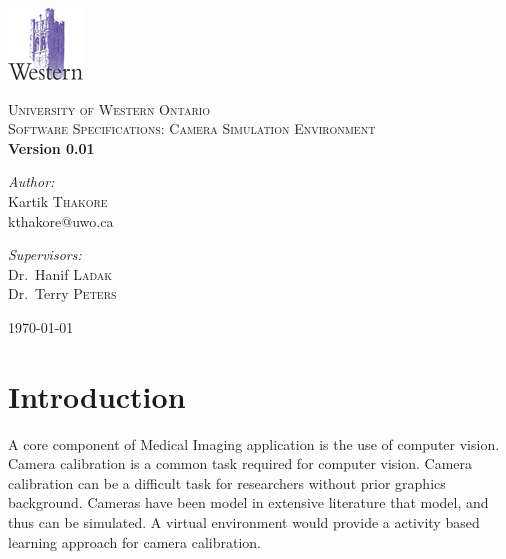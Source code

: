 \documentclass[11pt]{report}
\begin{document}
\begin{titlepage}

\begin{center}


\includegraphics[scale=1.0]{images/logo.png}

\textsc{\LARGE University of Western Ontario}\\[1.5cm]

\textsc{\Large Software Specifications: Camera Simulation Environment}\\[0.5cm]


{ \huge \bfseries Version 0.01}\\[0.4cm]

\begin{minipage}{0.4\textwidth}
\begin{flushleft} \large
\emph{Author:}\\
Kartik \textsc{Thakore} \\
kthakore@uwo.ca 
\end{flushleft}
\end{minipage}
\begin{minipage}{0.4\textwidth}
\begin{flushright} \large
\emph{Supervisors:} \\
Dr.~Hanif \textsc{Ladak}\\
Dr.~Terry \textsc{Peters} 
\end{flushright}
\end{minipage}

\vfill

{\large \today}

\end{center}

\end{titlepage}

\nocite{*}

\tableofcontents

\newpage 

\chapter{Introduction}
  
A core component of Medical Imaging application is the use of computer vision. Camera calibration is a common task required for computer vision. Camera calibration can be a difficult task for researchers without prior graphics background. Cameras have been model in extensive literature that model, and thus can be simulated. A virtual environment would provide a activity based learning approach for camera calibration. 
     
\end{document}
